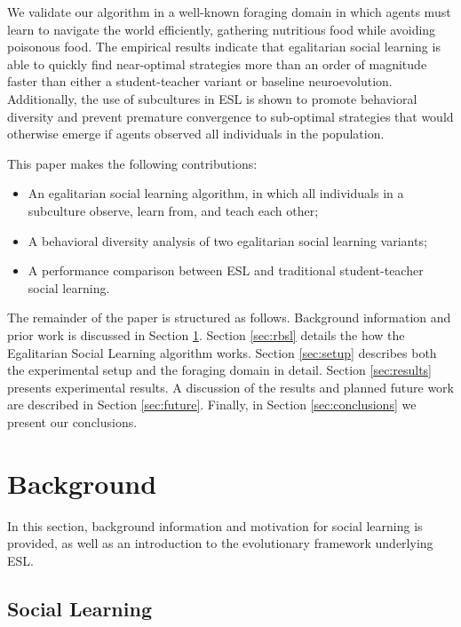 \documentclass{sig-alternate}
\begin{document}
We validate our algorithm in a well-known foraging domain \cite{denaro1996cultural,haasdijk2008social,vogt2010modeling,acerbi2007social,de2011incremental} in which agents must learn to navigate the world efficiently, gathering nutritious food while avoiding poisonous food. The empirical results indicate that egalitarian social learning is able to quickly find near-optimal strategies more than an order of magnitude faster than either a student-teacher variant or baseline neuroevolution. Additionally, the use of subcultures in ESL is shown to promote behavioral diversity and prevent premature convergence to sub-optimal strategies that would otherwise emerge if agents observed all individuals in the population.

This paper makes the following contributions:
 
\begin{itemize}
\item An egalitarian social learning algorithm, in which all individuals in a subculture observe, learn from, and teach each other;
\item A behavioral diversity analysis of two egalitarian social learning variants;
\item A performance comparison between ESL and traditional student-teacher social learning.
\end{itemize}
 
The remainder of the paper is structured as follows.
Background information and prior work is discussed in Section \ref{sec:background}.
Section \ref{sec:rbsl} details the how the Egalitarian Social Learning algorithm works. Section \ref{sec:setup} describes both the experimental setup and the foraging domain in detail.
Section \ref{sec:results} presents experimental results.
A discussion of the results and planned future work are described in Section \ref{sec:future}.
Finally, in Section \ref{sec:conclusions} we present our conclusions.

\section{Background}
\label{sec:background}
In this section, background information and motivation for social learning is provided, as well as an introduction to the evolutionary framework underlying ESL.

\subsection{Social Learning}
\end{document}
